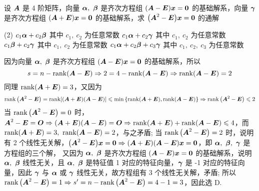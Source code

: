 \begin{example}
    设 $\vb*{A}$ 是 4 阶矩阵，向量 $\vb*{\alpha},~\vb*{\beta}$ 是齐次方程组 $(\vb*{A}-\vb*{E})\vb*{x}=\vb*{0}$ 的基础解系，向量 $\vb*{\gamma}$ 是齐次方程组 $(\vb*{A}+\vb*{E})\vb*{x}=\vb*{0}$ 的基础解系，求 $\qty(\vb*{A}^2-\vb*{E})\vb*{x}=\vb*{0}$ 的通解
    \begin{tasks}(2)
        \task $c_1\vb*{\alpha}+c_2\vb*{\beta}$ 其中 $c_1,~c_2$ 为任意常数
        \task $c_1\vb*{\alpha}+c_2\vb*{\gamma}$ 其中 $c_1,~c_2$ 为任意常数
        \task $c_1\vb*{\beta}+c_2\vb*{\gamma}$ 其中 $c_1,~c_2$ 为任意常数
        \task $c_1\vb*{\alpha}+c_2\vb*{\beta}+c_3\vb*{\gamma}$ 其中 $c_1,~c_2,~c_3$ 为任意常数
    \end{tasks}
\end{example}
\begin{solution}
    因为向量 $\vb*{\alpha},~\vb*{\beta}$ 是齐次方程组 $(\vb*{A}-\vb*{E})\vb*{x}=\vb*{0}$ 的基础解系，所以 $$s=n-\rank(\vb*{A}-\vb*{E})\Rightarrow 2=4-\rank(\vb*{A}-\vb*{E})\Rightarrow \rank(\vb*{A}-\vb*{E})=2$$
    同理 $\rank(\vb*{A}+\vb*{E})=3$，又因为 
    $$\rank\qty(\vb*{A}^2-\vb*{E})=\rank[(\vb*{A}+\vb*{E})(\vb*{A}-\vb*{E})]\leqslant \min\qty{\rank(\vb*{A}+\vb*{E}),\rank(\vb*{A}-\vb*{E})}\Rightarrow \rank\qty(\vb*{A}^2-\vb*{E})\leqslant 2$$
    当 $\rank\qty(\vb*{A}^2-\vb*{E})=0$ 时，$\vb*{A}^2-\vb*{E}=\vb*{O}\Rightarrow (\vb*{A}+\vb*{E})(\vb*{A}-\vb*{E})=\vb*{O}\Rightarrow \rank(\vb*{A}+\vb*{E})+\rank(\vb*{A}-\vb*{E})\leqslant 4$，而 $\rank(\vb*{A}+\vb*{E})=3,~\rank(\vb*{A}-\vb*{E})=2$，与之矛盾;
    当 $\rank\qty(\vb*{A}^2-\vb*{E})=2$ 时，说明有 2 个线性无关解，$\qty(\vb*{A}^2-\vb*{E})\vb*{x}=\vb*{0}\Rightarrow (\vb*{A}+\vb*{E})(\vb*{A}-\vb*{E})\vb*{x}=\vb*{0}$，即 $\vb*{\alpha},~\vb*{\beta},~\vb*{\gamma}$ 是方程组的三个解，
    又因为 $\vb*{\alpha},~\vb*{\beta}$ 是齐次方程组 $(\vb*{A}-\vb*{E})\vb*{x}=\vb*{0}$ 的基础解系，说明 $\vb*{\alpha},~\vb*{\beta}$ 线性无关，且 $\vb*{\alpha},~\vb*{\beta}$ 是特征值 1 对应的特征向量，$\vb*{\gamma}$ 是 -1 对应的特征向量，因此 $\vb*{\gamma}$ 与 $\vb*{\alpha}$ 或 $\vb*{\gamma}$ 线性无关，故方程组有 3 个线性无关解，矛盾;
    所以 $\rank\qty(\vb*{A}^2-\vb*{E})=1\Rightarrow s'=n-\rank\qty(\vb*{A}^2-\vb*{E})=4-1=3$，因此选 D.
\end{solution}
